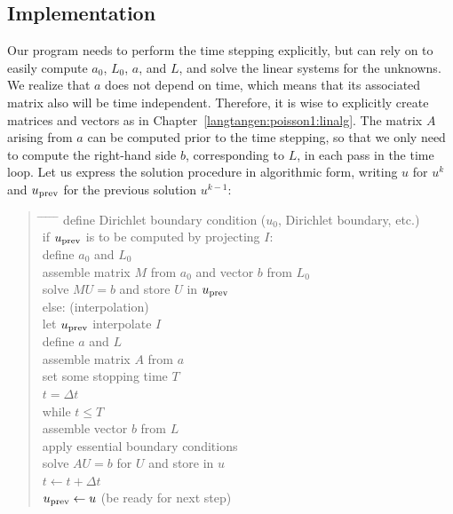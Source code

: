 \subsection{Implementation}
\label{langtangen:timedep:diffusion1:impl}

Our program needs to perform the time stepping explicitly, but can
rely on \fenics{} to easily compute $a_0$, $L_0$, $a$, and $L$,
and solve the linear systems for the unknowns.
We realize that $a$ does not depend on time, which means that its
associated matrix also will be time independent. Therefore, it is wise to
explicitly
create matrices and vectors as in Chapter~\ref{langtangen:poisson1:linalg}.
The matrix $A$ arising from $a$ can be computed prior to the time stepping,
so that we
only need to compute the right-hand side $b$, corresponding to $L$,
in each pass in the time loop. Let us express the
solution procedure in algorithmic form, writing
$u$ for $u^k$ and $u_{\rm prev}$
for the previous solution $u^{k-1}$:

\begin{quote}
\begin{tabbing}
\hspace*{0.5cm}\= \hspace{0.5cm} \= \hspace{0.5cm} \=
\hspace{0.5cm} \= \hspace{0.5cm} \= \kill
define Dirichlet boundary condition ($u_0$, Dirichlet boundary, etc.)\\
if $u_{\rm prev}$ is to be computed by projecting $I$:\\
\>define $a_0$ and $L_0$\\
\> assemble matrix $M$ from $a_0$ and vector $b$ from $L_0$\\
\> solve $MU=b$ and store $U$ in $u_{\rm prev}$\\
else:  (interpolation)\\
\> let $u_{\rm prev}$ interpolate $I$\\
define $a$ and $L$\\
assemble matrix $A$ from $a$\\
set some stopping time $T$\\
$t=\Delta t$\\
while $t\leq T$\\
\> assemble vector $b$ from $L$\\
\> apply essential boundary conditions\\
\> solve $AU=b$ for $U$ and store in $u$\\
\> $t\leftarrow t + \Delta t$\\
\> $u_{\rm prev} \leftarrow u$ (be ready for next step)
\end{tabbing}
\end{quote}


